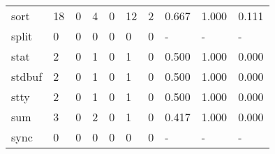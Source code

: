 \begin{longtable}{lp{1.3cm}p{1.3cm}p{1.3cm}p{1.3cm}p{1.3cm}p{1.3cm}p{1.3cm}p{1.3cm}p{1.3cm}}
sort      &                     18 &                                             0 &                                            4 &                                           0 &                                           12 &                                          2 &                                0.667 &                                  1.000 &                                0.111 \\
split     &                      0 &                                             0 &                                            0 &                                           0 &                                            0 &                                          0 &                                    - &                                      - &                                    - \\
stat      &                      2 &                                             0 &                                            1 &                                           0 &                                            1 &                                          0 &                                0.500 &                                  1.000 &                                0.000 \\
stdbuf    &                      2 &                                             0 &                                            1 &                                           0 &                                            1 &                                          0 &                                0.500 &                                  1.000 &                                0.000 \\
stty      &                      2 &                                             0 &                                            1 &                                           0 &                                            1 &                                          0 &                                0.500 &                                  1.000 &                                0.000 \\
sum       &                      3 &                                             0 &                                            2 &                                           0 &                                            1 &                                          0 &                                0.417 &                                  1.000 &                                0.000 \\
sync      &                      0 &                                             0 &                                            0 &                                           0 &                                            0 &                                          0 &                                    - &                                      - &                                    - \\

\end{longtable}
